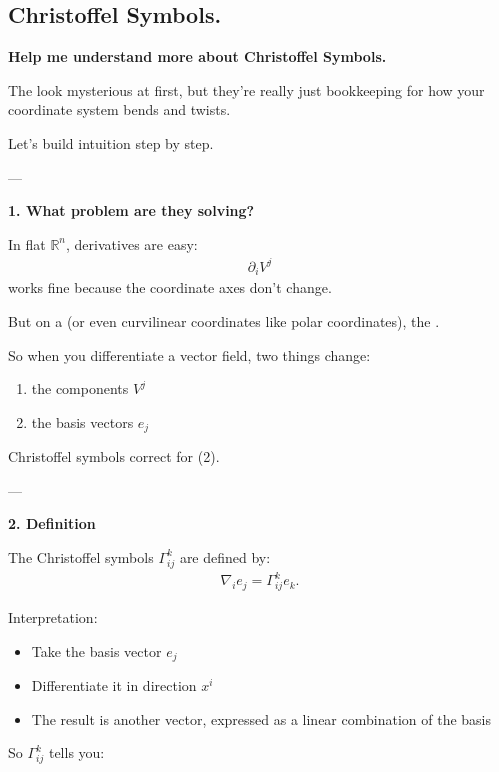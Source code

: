 \documentclass[12pt,a4paper]{report}
\begin{document}
\begin{description}
\subsection*{Christoffel Symbols.}
\item \textbf{Help me understand more about Christoffel Symbols.}

The  look mysterious at first, but they’re really just bookkeeping for how your coordinate system bends and twists.

Let’s build intuition step by step.

---

\item \textbf{ 1. What problem are they solving?}

In flat $\mathbb{R}^n$, derivatives are easy:
\begin{align*}
\partial_i V^j
\end{align*}
works fine because the coordinate axes don’t change.

But on a  (or even curvilinear coordinates like polar coordinates), the .

So when you differentiate a vector field, two things change:

\begin{enumerate}
\item the components $V^j$
\item the basis vectors $e_j$
\end{enumerate}

Christoffel symbols correct for (2).

---

\item \textbf{ 2. Definition}

The Christoffel symbols $\Gamma^k_{ij}$ are defined by:
\begin{align*}
\nabla_i e_j = \Gamma^k_{ij} e_k.
\end{align*}

Interpretation:

\begin{itemize}
\item  Take the basis vector $e_j$
\item  Differentiate it in direction $x^i$
\item  The result is another vector, expressed as a linear combination of the basis
\end{itemize}

So $\Gamma^k_{ij}$ tells you:


\end{description}
\end{document}
